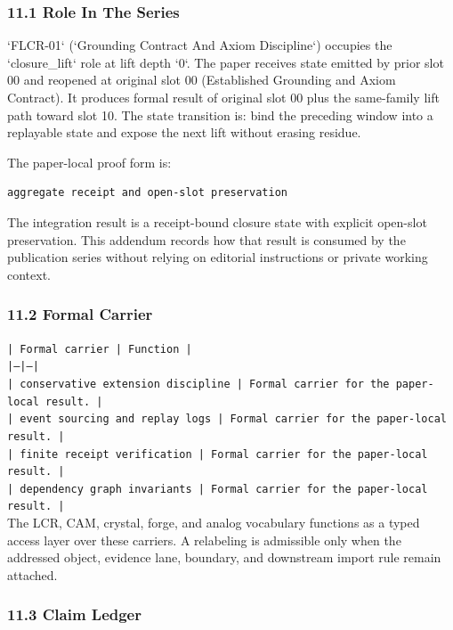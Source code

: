 \documentclass[11pt]{article}
\begin{document}
\subsubsection*{11.1 Role In The Series}

`FLCR-01` (`Grounding Contract And Axiom Discipline`) occupies the `closure\_lift` role at lift depth `0`.
The paper receives state emitted by prior slot 00 and reopened at original slot 00 (Established Grounding and Axiom Contract). It produces formal result of original slot 00 plus the same-family lift path toward slot 10. The state transition is:
bind the preceding window into a replayable state and expose the next lift without erasing residue.

The paper-local proof form is:

\begin{verbatim}
aggregate receipt and open-slot preservation
\end{verbatim}

The integration result is a receipt-bound closure state with explicit open-slot preservation. This addendum records how that result is
consumed by the publication series without relying on editorial instructions or
private working context.

\subsubsection*{11.2 Formal Carrier}

\noindent\texttt{| Formal carrier | Function |}\\
\noindent\texttt{|---|---|}\\
\noindent\texttt{| conservative extension discipline | Formal carrier for the paper-local result. |}\\
\noindent\texttt{| event sourcing and replay logs | Formal carrier for the paper-local result. |}\\
\noindent\texttt{| finite receipt verification | Formal carrier for the paper-local result. |}\\
\noindent\texttt{| dependency graph invariants | Formal carrier for the paper-local result. |}\\

The LCR, CAM, crystal, forge, and analog vocabulary functions as a typed access
layer over these carriers. A relabeling is admissible only when the addressed
object, evidence lane, boundary, and downstream import rule remain attached.

\subsubsection*{11.3 Claim Ledger}
\end{document}
